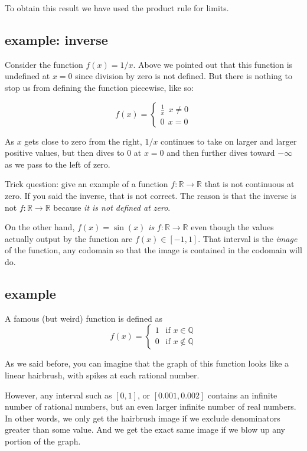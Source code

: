 \documentclass[11pt, oneside]{article}
\begin{document}
To obtain this result we have used the product rule for limits. 

\subsection*{example:  inverse}
Consider the function $f(x) = 1/x$.  Above we pointed out that this function is undefined at $x=0$ since division by zero is not defined.  But there is nothing to stop us from defining the function piecewise, like so:

\[ f(x) = 
\begin{cases}
\frac{1}{x} \ \ x \ne 0 \\
0 \ \ x = 0 
\end{cases} \]

As $x$ gets close to zero from the right, $1/x$ continues to take on larger and larger positive values, but then dives to $0$ at $x=0$ and then further dives toward $-\infty$ as we pass to the left of zero.

Trick question:  give an example of a function $f : \mathbb{R} \rightarrow \mathbb{R}$ that is not continuous at zero.  If you said the inverse, that is not correct.  The reason is that the inverse is not $f : \mathbb{R} \rightarrow \mathbb{R}$ because \emph{it is not defined at zero}.

On the other hand, $f(x) = \sin(x)$ \emph{is} $f : \mathbb{R} \rightarrow \mathbb{R}$ even though the values actually output by the function are $f(x) \in [-1,1]$.  That interval is the \emph{image} of the function, any codomain so that the image is contained in the codomain will do.

\subsection*{example}
A famous (but weird) function is defined as
\[ f(x) =
\begin{cases}
1 \ \ \text{ if } x \in \mathbb{Q} \\
0 \ \ \text{ if } x \notin \mathbb{Q} 
\end{cases}
\]

As we said before, you can imagine that the graph of this function looks like a linear hairbrush, with spikes at each rational number.

However, any interval such as $[0,1]$, or $[0.001, 0.002]$ contains an infinite number of rational numbers, but an even larger infinite number of real numbers.  In other words, we only get the hairbrush image if we exclude denominators greater than some value.  And we get the exact same image if we blow up any portion of the graph.
\end{document}

